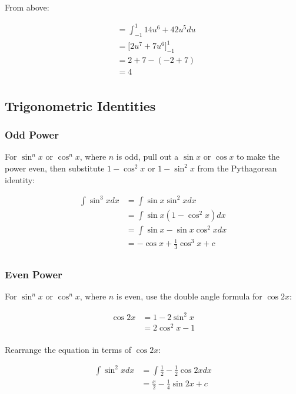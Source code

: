 \documentclass[a4paper,11pt]{article}
\begin{document}
From above:

$$
\begin{aligned}
& = \int_{-1}^1 14u^6 + 42u^5 du \\
& = \big[2u^7 + 7u^6\big]_{-1}^1 \\
& = 2 + 7 - (-2 + 7) \\
& = 4 \\
\end{aligned}
$$


\subsection{Trigonometric Identities}

\subsubsection{Odd Power}

For $\sin^n{x}$ or $\cos^n{x}$, where $n$ is odd, pull out a $\sin{x}$ or
$\cos{x}$ to make the power even, then substitute $1 - \cos^2{x}$ or
$1 - \sin^2{x}$ from the Pythagorean identity:

$$
\begin{aligned}
\int \sin^3{x} dx & = \int \sin{x}\sin^2{x} dx \\
& = \int \sin{x}(1 - \cos^2{x}) dx \\
& = \int \sin{x} - \sin{x}\cos^2{x} dx \\
& = -\cos{x} + \frac{1}{3} \cos^3{x} + c \\
\end{aligned}
$$


\subsubsection{Even Power}

For $\sin^n{x}$ or $\cos^n{x}$, where $n$ is even, use the double angle formula
for $\cos{2x}$:

$$
\begin{aligned}
\cos{2x} & = 1 - 2\sin^2{x} \\
& = 2\cos^2{x} - 1 \\
\end{aligned}
$$

Rearrange the equation in terms of $\cos{2x}$:

$$
\begin{aligned}
\int \sin^2{x} dx & = \int \frac{1}{2} - \frac{1}{2}\cos{2x} dx \\
& = \frac{x}{2} - \frac{1}{4}\sin{2x} + c \\
\end{aligned}
$$
\end{document}
